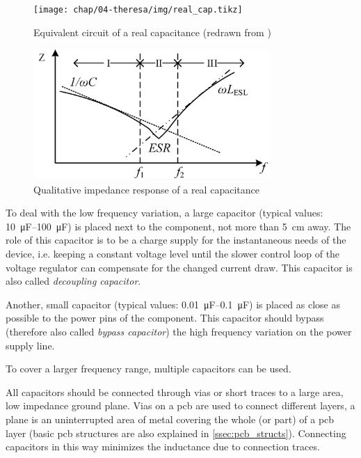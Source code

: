 \tikzexternaldisable
\begin{figure}[tb]
	\centering
	\texttt{[image: chap/04-theresa/img/real\_cap.tikz]}
	\caption[Capacitor equivalent circuit]{Equivalent circuit of a real capacitance (redrawn from \cite{decouple})}
	\label{fig:real_cap}
\end{figure}
\tikzexternalenable
\begin{figure}[tb]
	\centering
	\includegraphics[width = 0.8\textwidth]{chap/04-theresa/img/esl_esr}
	\caption[Impedance response of a real capacitor]{Qualitative impedance response of a real capacitance \cite{Dang2020}}
	\label{fig:esl_esr}
\end{figure}


To deal with the low frequency variation, a large capacitor (typical values: \SIrange{10}{100}{\micro\farad}) is placed next to the component, not more than \SI{5}{\centi \metre} away.
The role of this capacitor is to be a charge supply for the instantaneous needs of the device, i.e. keeping a constant voltage level until the slower control loop of the voltage regulator can compensate for the changed current draw. \cite{decouple}
This capacitor is also called \textit{decoupling capacitor}.

Another, small capacitor (typical values: \SIrange{0.01}{0.1}{\micro \farad}) is placed as close as possible to the power pins of the component.
This capacitor should bypass (therefore also called \textit{bypass capacitor}) the high frequency variation on the power supply line. \cite{decouple}

To cover a larger frequency range, multiple capacitors can be used.

All capacitors should be connected through vias or short traces to a large area, low impedance ground plane. Vias on a \gls{pcb} are used to connect different layers, a plane is an uninterrupted area of metal covering the whole (or part) of a \gls{pcb} layer (basic \gls{pcb} structures are also  explained in \autoref{ssec:pcb_structs}). 
Connecting capacitors in this way minimizes the inductance due to connection traces. \cite{decouple}


